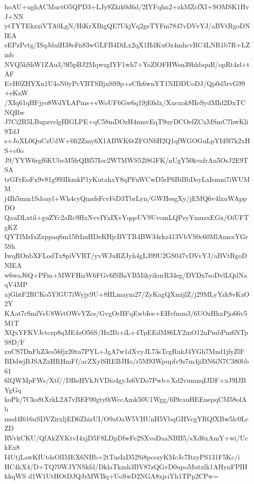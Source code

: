 hoAU+ughACMuctO5QPD3+LJy8Zkik0d6d/2IYFqhn2+zkMZcfXI+SOMSK1HvJ+NN
ytTYTEkzxiVTA0LgN/HiKrXBigQE7UkjVq2geTYFm7847vDVvYJ/aBVtRgoDNIEA
eEPzPctg/ISqJdulH38eFn83wGLFB4DiLx2qX1HdKuOz4mhcvRC4LNR1b7R+LZmb
NVQ5hShW1ZAu3/9f5pBJ2MqwzgIYF1wh7+YoZlOFHWsn39hhbquB/opRt4zl+tAF
EvH0ZHYXn1U4oN0yPcVBTSBjnSS9p+sCfk6wnYT1NIDDUoDJ/Qp0d5rvG99+eKnW
/XIq61qHFjyo8WdYLAPms+vWoUF6Gw6q19jE6dx/Xxexok8HeSydMId2DxTCNQRw
J7Ci2R5LBupzvelgHIGLPE+qC58mDOzH4nmvEqT9uyDCOefZCxMSmC7hwKli9TdJ
s+JoXL0QuCzUdW+0fi2Zmy6X1ABWK6tZFON6H2Q1qfWGOGuLpYI49l7k2xHS+c0o
J9/YYW6rgf6KUbeM5frQBf57Ioc2W7MWS52l8GFK/nUgY50kvafrAn5OsJ2E9TSA
trGFrEoFx9v81g993IkmkP1yKutahxY8qPFnWCwD5rP6BiBbDsyLxIsmni7iWUMM
j4Ih5mm1Sdoayl+Wh4cyQmsfsFcvFsD3TbrLyn/GWHesgXy/jEMQ6v4lxuWAppDO
QauDLxtil+guZYc2aRc9HxNvvIYxIXvYqqeUV9UvomLQPsyYmuzxEGx/OiUFTgKZ
QYTfMrIxZxppaq6m15ftImHDeKHjcBVTR4BW34rkz413VbVS0c60MlAmsxYGr5Sh
IwqROnbXFLodTx8piVVRT/yvWJuRZJyh4gL399U2GS047vDVvYJ/aBVtRgoDNIEA
w6waJ6Q+PFm+MWFHizW6FGv6fSBaVBMikyikurR34eg/DVDx7soDvlLQdNaqV4MP
ajGhtF2RCKo5YlGU7iWyjy9U+8HLmaym27/ZyKagQXmijlZ/j29MLyYzk8vKzO2Y
KAat7rSmlVsU8WrtOWvYZcs/GvgOrHFqEwbIee+EHvfmm3/6UOzHhxPjo66v5M1T
XQxYFKVJctczp8qME4zO56S/Hz2Ib+iL+4TpEEdM86LY2mO12nPmbPm6NTpS8D/F
zuCS7DnFhZ3cs56fjz20tn7PYL+JgA7w1dXvyJL73sTcgRukJ4YGh7Mnd1jfyZlF
BDdwjBJSAZxHRHmFf/acZXylSREBJHo/r5M93Wpupfv9z7m4jiDN6iN7C380bb61
6lQWMpFWs/Xtf//DBoHVkJtVDio4gyJs6VDo7Pwb+Xd2vumnqIJDF+xJ9IJBYgGq
koPk/7Cko8tXrkL2A7vBEF00gty0iWccAmk50U1Wgg/6I9cauHEEuepqCM58olAb
msd4I616uSDVZirxljED6ZhizUI/O9aOaW5VHUnH5VbqGHVcgYRQfXBw5lc0LcZD
RVvkCKU/QfAkZYKtvI4xjD5F8LDpDfwFe2SXvoDaaNBH5/sXd6xAmY+wi/UckEx8
I4UtjLawKIUtdsOlIMEX6NHb+2tTueIzD52Si8pcszyKMcJc7ItzyPS131F5Kc/i
HC4kX4/D+TQ70WJYNSkfd/DklaTkmh3BV87zQGvD0upoMutxlk1AHynFPIHkkqWS
d1W1UtHOtDJQJrMWBq+UoSwD2NGA8xjciYh1TPp2CPw=
